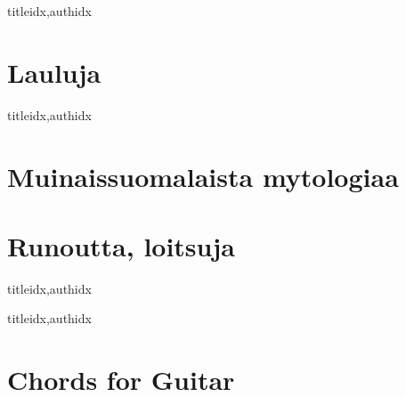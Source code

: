 \documentclass[twoside,10pt]{book}
\renewcommand{\lyricfont}{\sffamily\large} %
\begin{document}
  \clearpage\scleardpage
    \begin{songs}{titleidx,authidx}
      \setcounter{songnum}{400}
      
    \end{songs}
    
  \clearpage\scleardpage
    \begin{otherlanguage}{finnish} %
      \section{Lauluja}
        \begin{songs}{titleidx,authidx}
          \setcounter{songnum}{700}
          
          
        \end{songs}
      \clearpage\scleardpage
      \section{Muinaissuomalaista mytologiaa}
        
      \clearpage\scleardpage
      \section{Runoutta, loitsuja}
        \begin{songs}{titleidx,authidx}
          \setcounter{songnum}{800}
          \chordsoff %
          \renewcommand{\lyricfont}{\sffamily\small} %
          
          \renewcommand{\lyricfont}{\sffamily\Large} %
          \chordson
        \end{songs}
    \end{otherlanguage}
  \clearpage\scleardpage
    \begin{songs}{titleidx,authidx}
      \setcounter{songnum}{900}
      
    \end{songs}      

  \clearpage\scleardpage
    \section{Chords for Guitar}
       \\
      
  
  \clearpage
\end{document}
